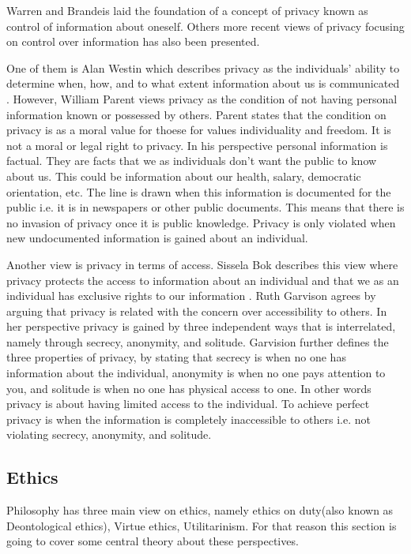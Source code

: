Warren and Brandeis laid the foundation of a concept of privacy known as control of information about oneself. Others more recent views of privacy focusing on control over information has also been presented.

One of them is Alan Westin which describes privacy as the individuals' ability to determine when, how, and to what extent information about us is communicated . 
However, William Parent views privacy as the condition of not having personal information known or possessed by others. Parent states that the condition on privacy is as a moral value for thoese for values individuality and freedom. It is not a moral or legal right to privacy. In his perspective personal information is factual. They are facts that we as individuals don't want the public to know about us. This could be information about our health, salary, democratic orientation, etc. The line is drawn when this information is documented for the public i.e. it is in newspapers or other public documents. This means that there is no invasion of privacy once it is public knowledge. Privacy is only violated when new undocumented information is gained about an individual. 


Another view is privacy in terms of access. Sissela Bok  describes this view where privacy protects the access to information about an individual and that we as an individual has exclusive rights to our information . Ruth Garvison agrees by arguing that privacy is related with the concern over accessibility to others. In her perspective privacy is gained by three independent ways that is interrelated, namely through secrecy, anonymity, and solitude. Garvision further defines the three properties of privacy, by stating that secrecy is when no one has information about the individual, anonymity is when no one pays attention to you, and solitude is when no one has physical access to one.  
In other words privacy is about having limited access to the individual. To achieve perfect privacy is when the information is completely inaccessible to others i.e. not violating secrecy, anonymity, and solitude. 

\subsection{Ethics}
Philosophy has three main view on ethics, namely ethics on duty(also known as Deontological ethics), Virtue ethics, Utilitarinism. For that reason this section is going to cover some central theory about these perspectives.

